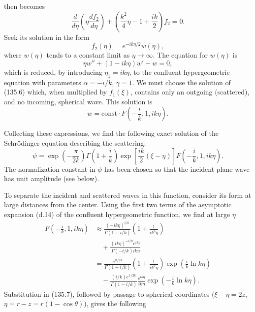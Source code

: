 then becomes
\[
 \frac{d}{d\eta}\left(\eta\frac{df_2}{d\eta}\right)
 +\left(\frac{k^2}{4}\eta-1+\frac{ik}{2}\right)f_2=0.
\]
Seek its solution in the form
\begin{equation}
 f_2(\eta)=e^{-ik\eta/2}w(\eta),
 \tag{135.5}
\end{equation}
where $w(\eta)$ tends to a constant limit as $\eta\to\infty$. The equation
for $w(\eta)$ is
\begin{equation}
 \eta w''+(1-ik\eta)w'-w=0,
 \tag{135.6}
\end{equation}
which is reduced, by introducing $\eta_1=ik\eta$, to the confluent
hypergeometric equation with parameters $\alpha=-i/k$, $\gamma=1$. We must
choose the solution of (135.6) which, when multiplied by $f_1(\xi)$, contains
only an outgoing (scattered), and no incoming, spherical wave. This solution
is
\[
 w=\mathrm{const}\cdot F\left(-\frac{i}{k},1,ik\eta\right).
\]

Collecting these expressions, we find the following exact solution of the
Schrödinger equation describing the scattering:
\begin{equation}
 \psi=\exp\left(-\frac{\pi}{2k}\right)\Gamma\left(1+\frac{i}{k}\right)
 \exp\left[\frac{ik}{2}(\xi-\eta)\right]
 F\left(-\frac{i}{k},1,ik\eta\right).
 \tag{135.7}
\end{equation}
The normalization constant in $\psi$ has been chosen so that the incident
plane wave has unit amplitude (see below).

To separate the incident and scattered waves in this function, consider its
form at large distances from the center. Using the first two terms of the
asymptotic expansion (d.14) of the confluent hypergeometric function, we find
at large $\eta$
\begin{align*}
 F\left(-\frac{i}{k},1,ik\eta\right)
 &\approx\frac{(-ik\eta)^{i/k}}{\Gamma(1+i/k)}
 \left(1+\frac{1}{ik^3\eta}\right)\\
 &\quad+\frac{(ik\eta)^{-i/k}e^{ik\eta}}{\Gamma(-i/k)ik\eta}\\
 &=\frac{e^{\pi/2k}}{\Gamma(1+i/k)}
 \left(1+\frac{1}{ik^3\eta}\right)
 \exp\left(\frac{i}{k}\ln k\eta\right)\\
 &\quad-\frac{(i/k)e^{\pi/2k}}{\Gamma(1-i/k)}
 \frac{e^{ik\eta}}{ik\eta}
 \exp\left(-\frac{i}{k}\ln k\eta\right).
\end{align*}
Substitution in (135.7), followed by passage to spherical coordinates
($\xi-\eta=2z$, $\eta=r-z=r(1-\cos\theta)$), gives the following

